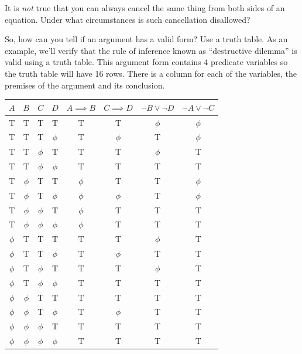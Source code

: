 \begin{exer}
It is \emph{not} true that you can always cancel the same thing from 
both sides of an equation.  Under what circumstances is such cancellation
disallowed?
\end{exer}

So, how can you tell if an argument has a valid form?  Use a truth table.
As an example, we'll verify that the rule of inference known as 
``destructive dilemma'' 
is valid using a truth table.  This argument
form contains 4 predicate variables so the truth table will have 16 rows.
There is a column for each of the variables, the premises of the argument
and its conclusion.

\begin{center}
\begin{tabular}{cccc|c|c|c|c|}
$A$   & $B$   & $C$   & $D$   & $A{\implies}B$ & $C{\implies}D$ & ${\lnot}B \lor {\lnot}D$ & ${\lnot}A \lor {\lnot}C$ \\ \hline
T     & T     & T     & T     & T     & T     & $\phi$ & $\phi$ \\
T     & T     & T     & $\phi$ & T     & $\phi$ & T     & $\phi$ \\
T     & T     & $\phi$ & T     & T     & T     & $\phi$ & T     \\
T     & T     & $\phi$ & $\phi$ & T     & T     & T     & T     \\
T     & $\phi$ & T     & T     & $\phi$ & T     & T     & $\phi$ \\
T     & $\phi$ & T     & $\phi$ & $\phi$ & $\phi$ & T     & $\phi$ \\
T     & $\phi$ & $\phi$ & T     & $\phi$ & T     & T     & T     \\
T     & $\phi$ & $\phi$ & $\phi$ & $\phi$ & T     & T     & T     \\ 
$\phi$ & T     & T     & T     & T     & T     & $\phi$ & T     \\
$\phi$ & T     & T     & $\phi$ & T     & $\phi$ & T     & T     \\
$\phi$ & T     & $\phi$ & T     & T     & T     & $\phi$ & T     \\
$\phi$ & T     & $\phi$ & $\phi$ & T     & T     & T     & T     \\
$\phi$ & $\phi$ & T     & T     & T     & T     & T     & T     \\
$\phi$ & $\phi$ & T     & $\phi$ & T     & $\phi$ & T     & T     \\
$\phi$ & $\phi$ & $\phi$ & T     & T     & T     & T     & T     \\
$\phi$ & $\phi$ & $\phi$ & $\phi$ & T     & T     & T     & T     \\
\end{tabular}
\end{center}

